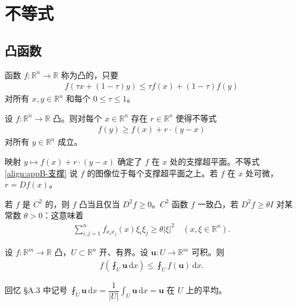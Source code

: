 \documentclass[../main.tex]{subfiles}
\begin{document}
\chapter{不等式}\label{chapter:appB-不等式}

\section{凸函数}\label{section:appB-凸函数}

\begin{definition}\label{definition:appB-凸函数}
函数 $f:\mathbb{R}^n\to\mathbb{R}$ 称为凸的，只要
\begin{align}
f(\tau x+(1-\tau)y)\leqslant\tau f(x)+(1-\tau)f(y)
\label{align:appB-凸性}
\end{align}
对所有 $x,y\in\mathbb{R}^n$ 和每个 $0\leqslant\tau\leqslant 1$。
\end{definition}

\begin{theorem}[支撑超平面。]\label{theorem:appB-支撑超平面}设 $f:\mathbb{R}^n\to\mathbb{R}$ 凸。则对每个 $x\in\mathbb{R}^n$ 存在 $r\in\mathbb{R}^n$ 使得不等式
\begin{align}
f(y)\geqslant f(x)+r\cdot(y-x)
\label{align:appB-支撑}
\end{align}
对所有 $y\in\mathbb{R}^n$ 成立。
\end{theorem}

映射 $y\mapsto f(x)+r\cdot(y-x)$ 确定了 $f$ 在 $x$ 处的支撑超平面。不等式\eqref{align:appB-支撑} 说 $f$ 的图像位于每个支撑超平面之上。若 $f$ 在 $x$ 处可微，$r=Df(x)$。

若 $f$ 是 $C^2$ 的，则 $f$ 凸当且仅当 $D^2f\geqslant 0$。$C^2$ 函数 $f$ 一致凸，若 $D^2f\geqslant\theta I$ 对某常数 $\theta>0$：这意味着
\begin{align*}
\sum_{i,j=1}^n f_{x_ix_j}(x)\xi_i\xi_j\geqslant\theta|\xi|^2 \quad (x,\xi\in\mathbb{R}^n).
\end{align*}

\begin{theorem}\label{theorem:appB-Jensen}设 $f:\mathbb{R}^m\to\mathbb{R}$ 凸，$U\subset\mathbb{R}^n$ 开、有界。设 $\mathbf{u}:U\to\mathbb{R}^m$ 可积。则
\begin{align}
f\left(\fint_U\mathbf{u}\,\mathrm{d}x\right)\leqslant\fint_U f(\mathbf{u})\,\mathrm{d}x.
\label{align:appB-Jensen}
\end{align}
\end{theorem}

回忆 \S A.3 中记号 $\fint_U\mathbf{u}\,\mathrm{d}x=\dfrac{1}{|U|}\int_U\mathbf{u}\,\mathrm{d}x=\mathbf{u}$ 在 $U$ 上的平均。
\end{document}
